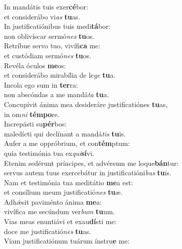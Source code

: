 \oddverse In mandátis tuis exer\textbf{cé}bor:~\*\\
\oddverse et considerábo vi\textit{as} \textbf{tu}as.\\
\evenverse In justificatiónibus tuis medi\textbf{tá}bor:~\*\\
\evenverse non oblivíscar sermó\textit{nes} \textbf{tu}os.\\
\oddverse Retríbue servo tuo, vivífi\textbf{ca} me:~\*\\
\oddverse et custódiam sermó\textit{nes} \textbf{tu}os.\\
\evenverse Revéla óculos \textbf{me}os:~\*\\
\evenverse et considerábo mirabília de le\textit{ge} \textbf{tu}a.\\
\oddverse Incola ego sum in \textbf{ter}ra:~\*\\
\oddverse non abscóndas a me mandá\textit{ta} \textbf{tu}a.\\
\evenverse Concupívit ánima mea desideráre justificatiónes \textbf{tu}as,~\*\\
\evenverse in om\textit{ni} \textbf{tém}\textbf{po}re.\\
\oddverse Increpásti su\textbf{pér}bos:~\*\\
\oddverse maledícti qui declínant a mandá\textit{tis} \textbf{tu}is.\\
\evenverse Aufer a me oppróbrium, et con\textbf{tém}ptum:~\*\\
\evenverse quia testimónia tua ex\textit{qui}\textbf{sí}vi.\\
\oddverse Etenim sedérunt príncipes, et advérsum me loque\textbf{bán}tur:~\*\\
\oddverse servus autem tuus exercebátur in justificatióni\textit{bus} \textbf{tu}is.\\
\evenverse Nam et testimónia tua meditátio \textbf{me}a est:~\*\\
\evenverse et consílium meum justificatió\textit{nes} \textbf{tu}æ.\\
\oddverse Adhǽsit paviménto ánima \textbf{me}a:~\*\\
\oddverse vivífica me secúndum ver\textit{bum} \textbf{tu}um.\\
\evenverse Vias meas enuntiávi et exau\textbf{dí}sti me:~\*\\
\evenverse doce me justificatió\textit{nes} \textbf{tu}as.\\
\oddverse Viam justificatiónum tuárum ínstru\textbf{e} me:~\*\\
